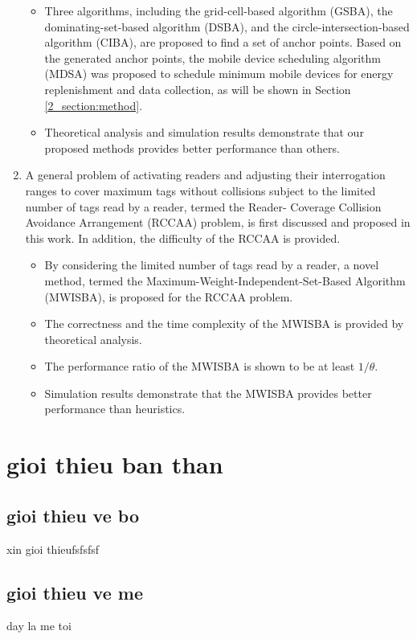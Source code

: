 \begin{enumerate}
    \begin{itemize}
      \item  Three algorithms, including the grid-cell-based algorithm (GSBA), the
        dominating-set-based algorithm (DSBA), and the
        circle-intersection-based algorithm (CIBA), are proposed to find a
        set of anchor points. Based on the generated anchor points, the
        mobile device scheduling algorithm (MDSA) was proposed to schedule
        minimum mobile devices for energy replenishment and data collection, as will be shown
        in Section \ref{2_section:method}.
      \item Theoretical analysis and simulation results demonstrate that our proposed methods
      provides better performance than others.
    \end{itemize}

\item A general problem of activating readers and adjusting their interrogation ranges to cover
        maximum tags without collisions subject to the limited number of tags read by a reader, termed the Reader-
        Coverage Collision Avoidance Arrangement (RCCAA) problem, is first discussed and proposed in this work. In addition, the difficulty of the RCCAA is provided.

    \begin{itemize}
      \item By considering the limited number of tags read by a reader, a novel method, termed the Maximum-Weight-Independent-Set-Based Algorithm (MWISBA), is proposed for the RCCAA problem.
      \item The correctness and the time complexity of the MWISBA is provided by theoretical analysis.
      \item The performance ratio of the MWISBA is shown to be at least $1/\theta$.
      \item Simulation results demonstrate that the MWISBA provides better performance than heuristics.
    \end{itemize}

\end{enumerate}
\section{gioi thieu ban than}
\subsection{gioi thieu ve bo}
xin gioi thieufsfsfsf
\subsection{gioi thieu ve me}
day la me toi

